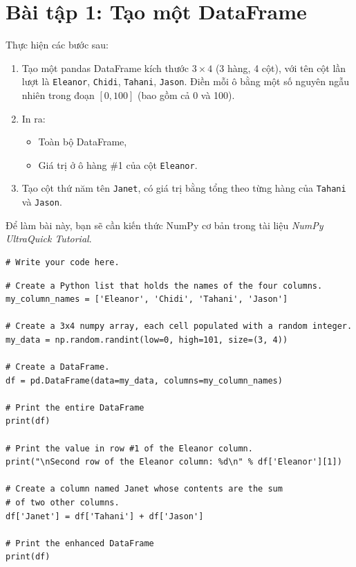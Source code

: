 \documentclass[12pt,a4paper]{article}
\begin{document}
\section{Bài tập 1: Tạo một DataFrame}

\begin{phuongphap}[title={Yêu cầu bài tập}]
Thực hiện các bước sau:
\begin{enumerate}
  \item Tạo một pandas DataFrame kích thước $3 \times 4$ (3 hàng, 4 cột), với tên cột lần lượt là
  \texttt{Eleanor}, \texttt{Chidi}, \texttt{Tahani}, \texttt{Jason}. Điền mỗi ô bằng một số nguyên ngẫu nhiên trong đoạn \([0,100]\) (bao gồm cả 0 và 100).
  \item In ra:
  \begin{itemize}
    \item Toàn bộ DataFrame,
    \item Giá trị ở ô hàng \#1 của cột \texttt{Eleanor}.
  \end{itemize}
  \item Tạo cột thứ năm tên \texttt{Janet}, có giá trị bằng tổng theo từng hàng của \texttt{Tahani} và \texttt{Jason}.
\end{enumerate}

Để làm bài này, bạn sẽ cần kiến thức NumPy cơ bản trong tài liệu \textit{NumPy UltraQuick Tutorial}.
\end{phuongphap}

\begin{lstlisting}
# Write your code here.
\end{lstlisting}

\begin{lstlisting}
# Create a Python list that holds the names of the four columns.
my_column_names = ['Eleanor', 'Chidi', 'Tahani', 'Jason']

# Create a 3x4 numpy array, each cell populated with a random integer.
my_data = np.random.randint(low=0, high=101, size=(3, 4))

# Create a DataFrame.
df = pd.DataFrame(data=my_data, columns=my_column_names)

# Print the entire DataFrame
print(df)

# Print the value in row #1 of the Eleanor column.
print("\nSecond row of the Eleanor column: %d\n" % df['Eleanor'][1])

# Create a column named Janet whose contents are the sum
# of two other columns.
df['Janet'] = df['Tahani'] + df['Jason']

# Print the enhanced DataFrame
print(df)
\end{lstlisting}
\end{document}
